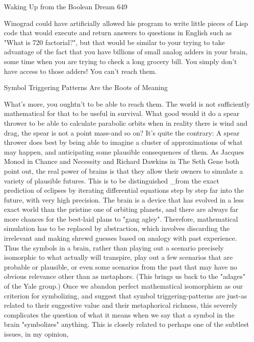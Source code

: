 Waking Up from the Boolean Dream                                                     649

Winograd could have artificially allowed his program to write little pieces of Lisp
code that would execute and return answers to questions in English such as "What is
720 factorial?", but that would be similar to your trying to take advantage of the fact
that you have billions of small analog adders in your brain, some time when you are
trying to check a long grocery bill. You simply don't have access to those adders! You
can't reach them.

              Symbol Triggering Patterns Are the Roots of Meaning

        What's more, you oughtn't to be able to reach them. The world is not
sufficiently mathematical for that to be useful in survival. What good would it do a
spear thrower to be able to calculate parabolic orbits when in reality there is wind and
drag, the spear is not a point mass-and so on? It's quite the contrary: A spear thrower
does best by being able to imagine a cluster of approximations of what may happen,
and anticipating some plausible consequences of them.
        As Jacques Monod in Chance and Necessity and Richard Dawkins in The Seth
Gene both point out, the real power of brains is that they allow their owners to
simulate a variety of plausible futures. This is to be distinguished \_from the exact
prediction of eclipses by iterating differential equations step by step far into the
future, with very high precision. The brain is a device that has evolved in a less exact
world than the pristine one of orbiting planets, and there are always far more chances
for the best-laid plans to "gang agley". Therefore, mathematical simulation has to be
replaced by abstraction, which involves discarding the irrelevant and making shrewd
guesses based on analogy with past experience. Thus the symbols in a brain, rather
than playing out a scenario precisely isomorphic to what actually will transpire, play
out a few scenarios that are probable or plausible, or even some scenarios from the
past that may have no obvious relevance other than as metaphors. (This brings us
back to the "adages" of the Yale group.)
        Once we abandon perfect mathematical isomorphism as our criterion for
symbolizing, and suggest that symbol triggering-patterns are just-as related to their
suggestive value and their metaphorical richness, this severely complicates the
question of what it means when we say that a symbol in the brain "symbolizes"
anything. This is closely related to perhaps one of the subtlest issues, in my opinion,
